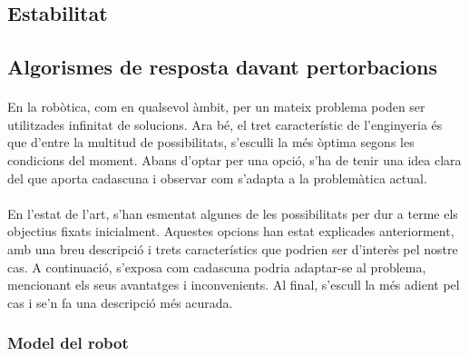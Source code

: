 \documentclass[12pt,a4paper,final,twoside]{article}
\begin{document}
\label{Estabilitat}
\subsection{Estabilitat}

\label{Algorismes}
\subsection{Algorismes de resposta davant pertorbacions}

\paragraph{}En la robòtica, com en qualsevol àmbit, per un mateix problema poden ser utilitzades infinitat de solucions. Ara bé, el tret característic de l'enginyeria és que d'entre la multitud de possibilitats, s'esculli la més òptima segons les condicions del moment. Abans d'optar per una opció, s'ha de tenir una idea clara del que aporta cadascuna i observar com s'adapta a la problemàtica actual.

\paragraph{}En l'estat de l'art, s'han esmentat algunes de les possibilitats per dur a terme els objectius fixats inicialment. Aquestes opcions han estat explicades anteriorment, amb una breu descripció i trets característics que podrien ser d'interès pel nostre cas. A continuació, s'exposa com cadascuna podria adaptar-se al problema, mencionant els seus avantatges i inconvenients. Al final, s'escull la més adient pel cas i se'n fa una descripció més acurada. 

\subsubsection{Model del robot}


\end{document}

